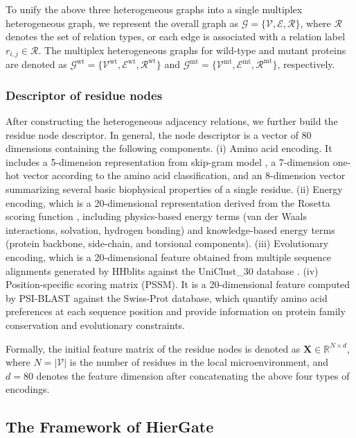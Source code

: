 \documentclass[journal,twoside,web]{ieeecolor}
\begin{document}
To unify the above three heterogeneous graphs into a single multiplex heterogeneous graph, we represent the overall graph as $\mathcal{G} = \{\mathcal{V},\mathcal{E},\mathcal{R}\}$, where $\mathcal{R}$ denotes the set of relation types, or each edge is associated with a relation label $r_{i,j} \in \mathcal{R}$. The multiplex heterogeneous graphs for wild-type and mutant proteins are denoted as $\mathcal{G}^{\text{wt}} = \{\mathcal{V}^{\text{wt}},\mathcal{E}^{\text{wt}},\mathcal{R}^{\text{wt}}\}$ and $\mathcal{G}^{\text{mt}} = \{\mathcal{V}^{\text{mt}},\mathcal{E}^{\text{mt}},\mathcal{R}^{\text{mt}}\}$, respectively.

\subsubsection{Descriptor of residue nodes}
\label{subsubsec:nodes}

After constructing the heterogeneous adjacency relations, we further build the residue node descriptor. In general, the node descriptor is a vector of 80 dimensions containing the following components. (i) Amino acid encoding. It includes a 5-dimension representation from skip-gram model \cite{Lv2021}, a 7-dimension one-hot vector according to the amino acid classification, and an 8-dimension vector summarizing several basic biophysical properties of a single residue. (ii) Energy encoding, which is a 20-dimensional representation derived from the Rosetta scoring function \cite{Alford2017_a}, including physics-based energy terms (van der Waals interactions, solvation, hydrogen bonding) and knowledge-based energy terms (protein backbone, side-chain, and torsional components). (iii) Evolutionary encoding, which is a 20-dimensional feature obtained from multiple sequence alignments generated by HHblits \cite{Remmert2012} against the UniClust\_30 database \cite{Mirdita2017}. (iv) Position-specific scoring matrix (PSSM). It is a 20-dimensional feature computed by PSI-BLAST against the Swiss-Prot database, which quantify amino acid preferences at each sequence position and provide information on protein family conservation and evolutionary constraints.

Formally, the initial feature matrix of the residue nodes is denoted as $\bm{X} \in \mathbb{R}^{N \times d}$, where $N = \lvert \mathcal{V} \rvert$ is the number of residues in the local microenvironment, and $d = 80$ denotes the feature dimension after concatenating the above four types of encodings.

\subsection{The Framework of HierGate}
\label{subsec:framework}
\end{document}
